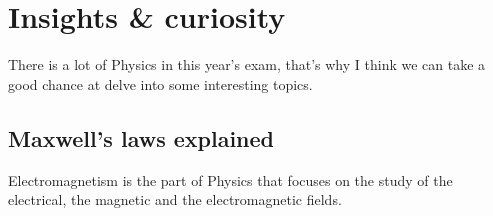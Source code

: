 \chapter[Insights \& curiosity]{Insights \& curiosity}
\label{ch:insights}
There is a lot of Physics in this year's exam, that's why I think we can
take a good chance at delve into some interesting topics.

\section{Maxwell's laws explained}
\label{sec:maxwell}
Electromagnetism is the part of Physics that focuses on the study of the
electrical, the magnetic and the electromagnetic fields.
